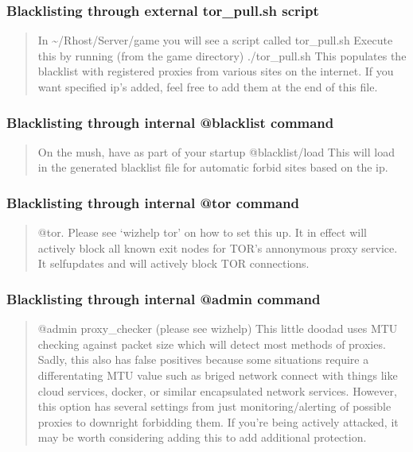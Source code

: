 \documentclass[letterpaper,10pt,english]{sphinxmanual}
\begin{document}
\subsubsection{Blacklisting through external tor\_pull.sh script}
\label{\detokenize{security:blacklisting-through-external-tor-pull-sh-script}}\begin{quote}

\sphinxAtStartPar
In \textasciitilde{}/Rhost/Server/game you will see a script called tor\_pull.sh
Execute this by running (from the game directory) ./tor\_pull.sh
This populates the blacklist with registered proxies from various sites
on the internet.  If you want specified ip’s added, feel free to add
them at the end of this file.
\end{quote}


\subsubsection{Blacklisting through internal @blacklist command}
\label{\detokenize{security:blacklisting-through-internal-blacklist-command}}\begin{quote}

\sphinxAtStartPar
On the mush, have as part of your startup @blacklist/load
This will load in the generated blacklist file for automatic forbid
sites based on the ip.
\end{quote}


\subsubsection{Blacklisting through internal @tor command}
\label{\detokenize{security:blacklisting-through-internal-tor-command}}\begin{quote}

\sphinxAtStartPar
@tor.  Please see ‘wizhelp tor’ on how to set this up.  It in effect
will actively block all known exit nodes for TOR’s annonymous proxy
service.  It self\sphinxhyphen{}updates and will actively block TOR connections.
\end{quote}


\subsubsection{Blacklisting through internal @admin command}
\label{\detokenize{security:blacklisting-through-internal-admin-command}}\begin{quote}

\sphinxAtStartPar
@admin proxy\_checker (please see wizhelp)
This little doodad uses MTU checking against packet size which will
detect most methods of proxies.  Sadly, this also has false positives
because some situations require a differentating MTU value such as
briged network connect with things like cloud services, docker, or
similar encapsulated network services.  However, this option has
several settings from just monitoring/alerting of possible proxies
to downright forbidding them.  If you’re being actively attacked,
it may be worth considering adding this to add additional protection.
\end{quote}
\end{document}
